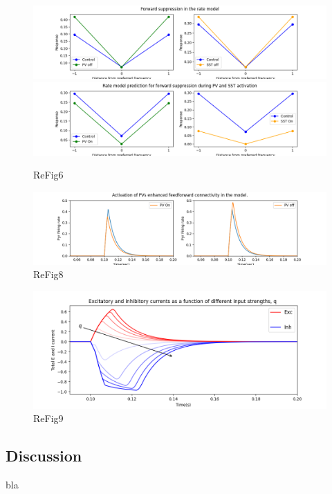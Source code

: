 \begin{figure}
 \includegraphics[width=\textwidth]{Figures/Fig6BC}
 \includegraphics[width=\textwidth]{Figures/Fig6DE}
 \caption{ReFig6}
\end{figure}

\begin{figure}
 \includegraphics[width=\textwidth]{Figures/Fig8BD}
 \caption{ReFig8}
\end{figure}

\begin{figure}
 \includegraphics[width=\textwidth]{Figures/Fig9}
 \caption{ReFig9}
\end{figure}

 



\FloatBarrier
\subsection{Discussion}
bla

